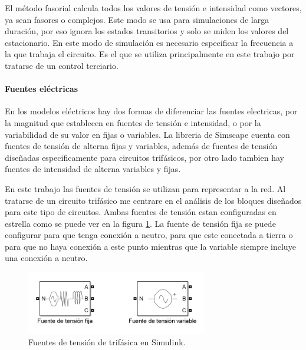 \documentclass{book}
\begin{document}
El m\'etodo fasorial calcula todos los valores de tensi\'on e intensidad como vectores, ya sean fasores o complejos. Este modo se usa para simulaciones de larga duraci\'on, por eso ignora los estados transitorios y solo se miden los valores del estacionario. En este modo de simulaci\'on es necesario especificar la frecuencia a la que trabaja el circuito. Es el que se utiliza principalmente en este trabajo por tratarse de un control terciario. \par

		\paragraph {Fuentes el\'ectricas}
En los modelos el\'ectricos hay dos formas de diferenciar las fuentes electricas, por la magnitud que establecen en fuentes de tensi\'on e intensidad, o por la variabilidad de su valor en fijas o variables. La libreria de Simscape cuenta con fuentes de tensi\'on de alterna fijas y variables, además de fuentes de tensi\'on diseñadas especificamente para circuitos trif\'asicos, por otro lado tambien hay fuentes de intensidad de alterna variables y fijas. \par

En este trabajo las fuentes de tensi\'on se utilizan para representar a la red. Al tratarse de un circuito trif\'asico me centrare en el an\'alisis de los bloques diseñados para este tipo de circuitos. Ambas fuentes de tensi\'on estan configuradas en estrella como se puede ver en la figura \ref{VoltageSources}. La fuente de tensi\'on fija se puede configurar para que tenga conexi\'on a neutro, para que este conectada a tierra o para que no haya conexi\'on a este punto mientras que la variable siempre incluye una conexi\'on a neutro. \par

\begin{figure}[h!]
\centering
\includegraphics[width=0.7\textwidth]{VoltageSources.PNG}
\caption{Fuentes de tensi\'on de trif\'asica en Simulink. }
\label{VoltageSources}
\end{figure} \par
\end{document}
